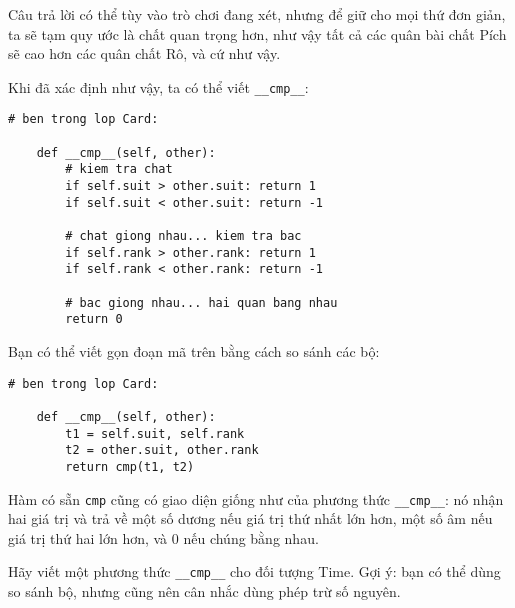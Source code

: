\documentclass[11pt]{book}
\begin{document}
Câu trả lời có thể tùy vào trò chơi đang xét, nhưng để giữ cho mọi thứ
đơn giản, ta sẽ tạm quy ước là chất quan trọng hơn, như vậy tất cả các
quân bài chất Pích sẽ cao hơn các quân chất Rô, và cứ như vậy.


Khi đã xác định như vậy, ta có thể viết \verb"__cmp__":

\beforeverb
\begin{verbatim}
# ben trong lop Card:

    def __cmp__(self, other):
        # kiem tra chat
        if self.suit > other.suit: return 1
        if self.suit < other.suit: return -1

        # chat giong nhau... kiem tra bac
        if self.rank > other.rank: return 1
        if self.rank < other.rank: return -1

        # bac giong nhau... hai quan bang nhau
        return 0    
\end{verbatim}
\afterverb
%
Bạn có thể viết gọn đoạn mã trên bằng cách so sánh các bộ:


\beforeverb
\begin{verbatim}
# ben trong lop Card:

    def __cmp__(self, other):
        t1 = self.suit, self.rank
        t2 = other.suit, other.rank
        return cmp(t1, t2)
\end{verbatim}
\afterverb
%
Hàm có sẵn {\tt cmp} cũng có giao diện giống như
của phương thức \verb"__cmp__": nó nhận hai giá trị và trả về
một số dương nếu giá trị thứ nhất lớn hơn, một số âm
nếu giá trị thứ hai lớn hơn, và 0 nếu chúng bằng nhau.



\begin{ex}
Hãy viết một phương thức \verb"__cmp__" cho đối tượng Time.  Gợi ý: bạn
có thể dùng so sánh bộ, nhưng cũng nên cân nhắc dùng phép trừ
số nguyên.



\end{ex}
\end{document}
